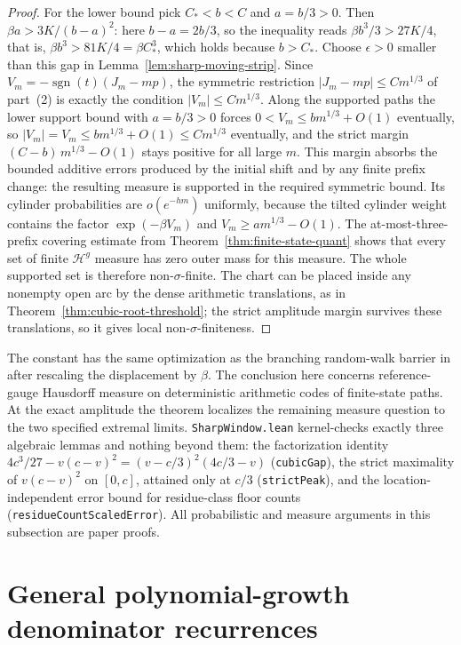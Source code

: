 \documentclass[11pt]{article}
\theoremstyle{definition}
\theoremstyle{remark}
\begin{document}
\begin{proof}
For the lower bound pick $C_*<b<C$ and $a=b/3>0$. Then
$\beta a>3K/(b-a)^2$: here $b-a=2b/3$, so the inequality reads
$\beta b^3/3>27K/4$, that is, $\beta b^3>81K/4=\beta C_*^3$,
which holds because $b>C_*$. Choose $\epsilon>0$ smaller than
this gap in Lemma~\ref{lem:sharp-moving-strip}.
Since $V_m=-\operatorname{sgn}(t)(J_m-mp)$, the symmetric
restriction $|J_m-mp|\le C m^{1/3}$ of part~(2) is exactly the
condition $|V_m|\le C m^{1/3}$. Along the supported paths the
lower support bound with $a=b/3>0$ forces
$0<V_m\le b m^{1/3}+O(1)$ eventually, so
$|V_m|=V_m\le b m^{1/3}+O(1)\le C m^{1/3}$ eventually, and the
strict margin $(C-b)\,m^{1/3}-O(1)$ stays positive for all
large $m$. This margin absorbs the bounded additive errors
produced by the initial shift and by any finite prefix change:
the resulting measure is supported in the required symmetric
bound. Its cylinder probabilities
are $o(e^{-hm})$ uniformly, because the tilted cylinder
weight contains the factor $\exp(-\beta V_m)$ and
$V_m\ge a m^{1/3}-O(1)$.
The at-most-three-prefix covering estimate from
Theorem~\ref{thm:finite-state-quant} shows that every set of
finite $\mathcal H^g$ measure has zero outer mass for this
measure. The whole supported set is therefore
non-$\sigma$-finite. The chart can be placed inside any
nonempty open arc by the dense arithmetic translations,
as in Theorem~\ref{thm:cubic-root-threshold}; the strict
amplitude margin survives these translations,
so it gives local non-$\sigma$-finiteness.
\end{proof}

The constant has the same optimization as the branching
random-walk barrier in \cite[Theorem~1.2]{JaffuelBarrier}
after rescaling the displacement by $\beta$. The conclusion
here concerns reference-gauge Hausdorff measure on deterministic
arithmetic codes of finite-state paths.
At the exact amplitude the theorem localizes the remaining
measure question to the two specified extremal limits.
\texttt{SharpWindow.lean} kernel-checks exactly three algebraic
lemmas and nothing beyond them: the factorization identity
$4c^3/27-v(c-v)^2=(v-c/3)^2(4c/3-v)$ (\texttt{cubicGap}), the
strict maximality of $v(c-v)^2$ on $[0,c]$, attained only at
$c/3$ (\texttt{strictPeak}), and the location-independent
error bound for residue-class floor counts
(\texttt{residueCountScaledError}). All probabilistic and
measure arguments in this subsection are paper proofs.


\section{General polynomial-growth denominator recurrences}\label{sec:poly-rec}
\end{document}
